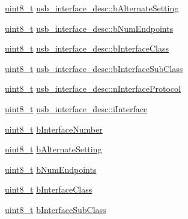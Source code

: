\begin{DoxyCompactItemize}
\hyperlink{stdint_8h_aba7bc1797add20fe3efdf37ced1182c5}{uint8\-\_\-t} \hyperlink{group___p_i_o_s___u_s_b___d_e_f_s_ga9fd5069255e2ed4e8c8bee39fd5c3e19}{usb\-\_\-interface\-\_\-desc\-::b\-Alternate\-Setting}
\item 
\hyperlink{stdint_8h_aba7bc1797add20fe3efdf37ced1182c5}{uint8\-\_\-t} \hyperlink{group___p_i_o_s___u_s_b___d_e_f_s_ga685562326d8af1c5eccd71bdb2794cd1}{usb\-\_\-interface\-\_\-desc\-::b\-Num\-Endpoints}
\item 
\hyperlink{stdint_8h_aba7bc1797add20fe3efdf37ced1182c5}{uint8\-\_\-t} \hyperlink{group___p_i_o_s___u_s_b___d_e_f_s_ga01e526f1b9ab4ee18ebeb28b17a5f7e8}{usb\-\_\-interface\-\_\-desc\-::b\-Interface\-Class}
\item 
\hyperlink{stdint_8h_aba7bc1797add20fe3efdf37ced1182c5}{uint8\-\_\-t} \hyperlink{group___p_i_o_s___u_s_b___d_e_f_s_gaf937eb2ea941b0470ccd69ae9c5478ac}{usb\-\_\-interface\-\_\-desc\-::b\-Interface\-Sub\-Class}
\item 
\hyperlink{stdint_8h_aba7bc1797add20fe3efdf37ced1182c5}{uint8\-\_\-t} \hyperlink{group___p_i_o_s___u_s_b___d_e_f_s_ga1e2e09e7b88f6a84a53129afefdc75d3}{usb\-\_\-interface\-\_\-desc\-::n\-Interface\-Protocol}
\item 
\hyperlink{stdint_8h_aba7bc1797add20fe3efdf37ced1182c5}{uint8\-\_\-t} \hyperlink{group___p_i_o_s___u_s_b___d_e_f_s_ga93404aa8e9b859c2759b7a02b6533222}{usb\-\_\-interface\-\_\-desc\-::i\-Interface}
\item 
\hyperlink{stdint_8h_aba7bc1797add20fe3efdf37ced1182c5}{uint8\-\_\-t} \hyperlink{group___p_i_o_s___u_s_b___d_e_f_s_ga3d66d88c5e928462aef62633449f1eb0}{b\-Interface\-Number}
\item 
\hyperlink{stdint_8h_aba7bc1797add20fe3efdf37ced1182c5}{uint8\-\_\-t} \hyperlink{group___p_i_o_s___u_s_b___d_e_f_s_ga4cdd7aab185365e51a1e722f43073b8c}{b\-Alternate\-Setting}
\item 
\hyperlink{stdint_8h_aba7bc1797add20fe3efdf37ced1182c5}{uint8\-\_\-t} \hyperlink{group___p_i_o_s___u_s_b___d_e_f_s_gacec2e7d68271baace354a0539f3d7e3d}{b\-Num\-Endpoints}
\item 
\hyperlink{stdint_8h_aba7bc1797add20fe3efdf37ced1182c5}{uint8\-\_\-t} \hyperlink{group___p_i_o_s___u_s_b___d_e_f_s_gae899427763e325f03241afc69a6e1ea0}{b\-Interface\-Class}
\item 
\hyperlink{stdint_8h_aba7bc1797add20fe3efdf37ced1182c5}{uint8\-\_\-t} \hyperlink{group___p_i_o_s___u_s_b___d_e_f_s_ga3b3919d1203cd42550d77287f7585595}{b\-Interface\-Sub\-Class}
\item 

\end{DoxyCompactItemize}
